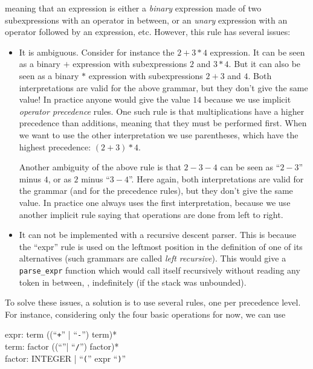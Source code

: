 \noindent meaning that an expression is either a {\em binary} expression made
of two subexpressions with an operator in between, or an {\em unary} expression
with an operator followed by an expression, etc. However, this rule has several
issues:
\begin{itemize}
  \item It is ambiguous. Consider for instance the $2+3*4$ expression. It can
  be seen as a binary $+$ expression with subexpressions $2$ and $3*4$. But it
  can also be seen as a binary $*$ expression with subexpressions $2+3$ and
  $4$. Both interpretations are valid for the above grammar, but they don't
  give the same value! In practice anyone would give the value $14$ because we
  use implicit {\em operator precedence} rules. One such rule is that
  multiplications have a higher precedence than additions, meaning that they
  must be performed first. When we want to use the other interpretation we use
  parentheses, which have the highest precedence: $(2+3)*4$.

  Another ambiguity of the above rule is that $2-3-4$ can be seen as ``$2-3$''
  minus $4$, or as $2$ minus ``$3-4$''. Here again, both interpretations are
  valid for the grammar (and for the precedence rules), but they don't give the
  same value. In practice one always uses the first interpretation, because we
  use another implicit rule saying that operations are done from left to right.

  \item It can not be implemented with a recursive descent parser. This is
  because the ``expr'' rule is used on the leftmost position in the definition
  of one of its alternatives (such grammars are called {\em left recursive}).
  This would give a {\tt parse\_expr} function which would call itself
  recursively without reading any token in between, \ie, indefinitely (if the
  stack was unbounded).
\end{itemize}

To solve these issues, a solution is to use several rules, one per precedence
level. For instance, considering only the four basic operations for now, we can
use

\begin{Paragraph}
expr: term ((``{\tt +}'' | ``{\tt -}'') term)*\\
term: factor ((``{\tt *}''| ``{\tt /}'') factor)*\\
factor: INTEGER | ``{\tt (}'' expr ``{\tt )}''
\end{Paragraph}

